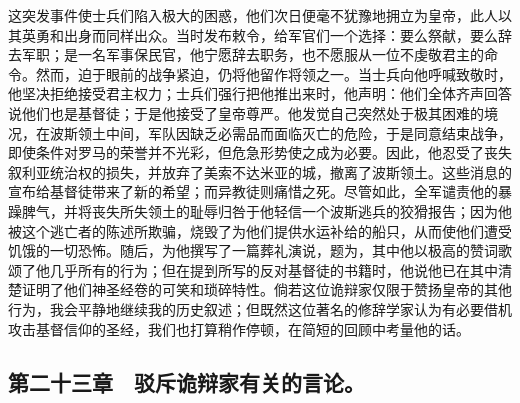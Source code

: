 这突发事件使士兵们陷入极大的困惑，他们次日便毫不犹豫地拥立为皇帝，此人以其英勇和出身而同样出众。当时发布敕令，给军官们一个选择：要么祭献，要么辞去军职；是一名军事保民官，他宁愿辞去职务，也不愿服从一位不虔敬君主的命令。然而，迫于眼前的战争紧迫，仍将他留作将领之一。当士兵向他呼喊致敬时，他坚决拒绝接受君主权力；士兵们强行把他推出来时，他声明：他们全体齐声回答说他们也是基督徒；于是他接受了皇帝尊严。他发觉自己突然处于极其困难的境况，在波斯领土中间，军队因缺乏必需品而面临灭亡的危险，于是同意结束战争，即使条件对罗马的荣誉并不光彩，但危急形势使之成为必要。因此，他忍受了丧失叙利亚统治权的损失，并放弃了美索不达米亚的城，撤离了波斯领土。这些消息的宣布给基督徒带来了新的希望；而异教徒则痛惜之死。尽管如此，全军谴责他的暴躁脾气，并将丧失所失领土的耻辱归咎于他轻信一个波斯逃兵的狡猾报告；因为他被这个逃亡者的陈述所欺骗，烧毁了为他们提供水运补给的船只，从而使他们遭受饥饿的一切恐怖。随后，为他撰写了一篇葬礼演说，题为，其中他以极高的赞词歌颂了他几乎所有的行为；但在提到所写的反对基督徒的书籍时，他说他已在其中清楚证明了他们神圣经卷的可笑和琐碎特性。倘若这位诡辩家仅限于赞扬皇帝的其他行为，我会平静地继续我的历史叙述；但既然这位著名的修辞学家认为有必要借机攻击基督信仰的圣经，我们也打算稍作停顿，在简短的回顾中考量他的话。\par


\subsection{第二十三章　驳斥诡辩家有关的言论。}

